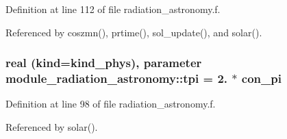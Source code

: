 Definition at line 112 of file radiation\+\_\+astronomy.\+f.



Referenced by coszmn(), prtime(), sol\+\_\+update(), and solar().

\subsubsection[{\texorpdfstring{tpi}{tpi}}]{\setlength{\rightskip}{0pt plus 5cm}real (kind=kind\+\_\+phys), parameter module\+\_\+radiation\+\_\+astronomy\+::tpi = 2. $\ast$ con\+\_\+pi\hspace{0.3cm}{\ttfamily [private]}}\hypertarget{group__module__radiation__astronomy_ga4fbf4be04e17f1f8d0674ee2e20506b0}{}\label{group__module__radiation__astronomy_ga4fbf4be04e17f1f8d0674ee2e20506b0}


Definition at line 98 of file radiation\+\_\+astronomy.\+f.



Referenced by solar().


